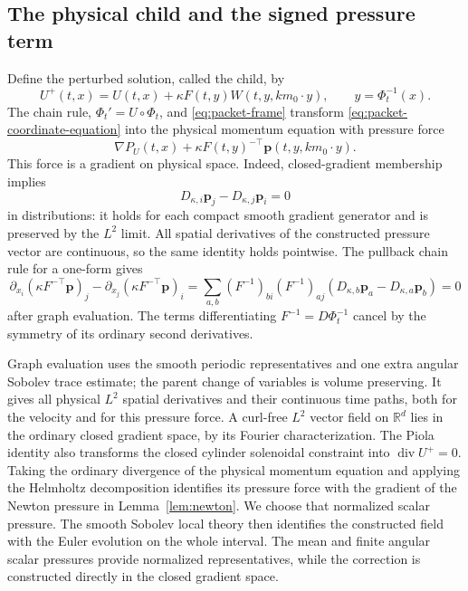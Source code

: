 \documentclass[11pt]{article}
\newcommand{\R}{\mathbb R}
\theoremstyle{definition}
\begin{document}
\subsection{The physical child and the signed pressure term}
Define the perturbed solution, called the child, by
\begin{equation}\label{eq:packet-exact-child}
 U^+(t,x)=U(t,x)+\kappa F(t,y)
          W(t,y,km_0\cdot y),\qquad y=\Phi_t^{-1}(x).
\end{equation}
The chain rule, $\Phi_t'=U\circ\Phi_t$, and
\eqref{eq:packet-frame} transform
\eqref{eq:packet-coordinate-equation} into the physical momentum equation
with pressure force
\[
 \nabla P_U(t,x)+\kappa F(t,y)^{-\top}
             \mathbf p(t,y,km_0\cdot y).
\]
This force is a gradient on physical space. Indeed, closed-gradient
membership implies
\[
 D_{\kappa,i}\mathbf p_j-D_{\kappa,j}\mathbf p_i=0
\]
in distributions: it holds for each compact smooth gradient generator
and is preserved by the $L^2$ limit. All spatial derivatives of the
constructed pressure vector are continuous, so the same identity holds
pointwise. The pullback chain rule for a one-form gives
\[
 \partial_{x_i}(\kappa F^{-\top}\mathbf p)_j
 -\partial_{x_j}(\kappa F^{-\top}\mathbf p)_i
 =\sum_{a,b}(F^{-1})_{bi}(F^{-1})_{aj}
       (D_{\kappa,b}\mathbf p_a-D_{\kappa,a}\mathbf p_b)=0
\]
after graph evaluation. The terms differentiating $F^{-1}=D\Phi_t^{-1}$
cancel by the symmetry of its ordinary second derivatives.

Graph evaluation uses the smooth periodic representatives and one extra
angular Sobolev trace estimate; the parent change of variables is volume
preserving. It gives all physical $L^2$ spatial derivatives and their
continuous time paths, both for the velocity and for this pressure force.
A curl-free $L^2$ vector field on $\R^d$ lies in the ordinary closed
gradient space, by its Fourier characterization. The Piola
identity also transforms the closed cylinder solenoidal constraint into
$\operatorname{div}U^+=0$. Taking the ordinary divergence of the physical
momentum equation and applying the Helmholtz decomposition identifies
its pressure force with the gradient of the Newton pressure in
Lemma~\ref{lem:newton}. We choose that normalized scalar pressure.
The smooth Sobolev local theory then identifies the constructed field
with the Euler evolution on the whole interval. The mean and finite
angular scalar pressures provide normalized
representatives, while the correction is constructed directly in the
closed gradient space.
\end{document}
